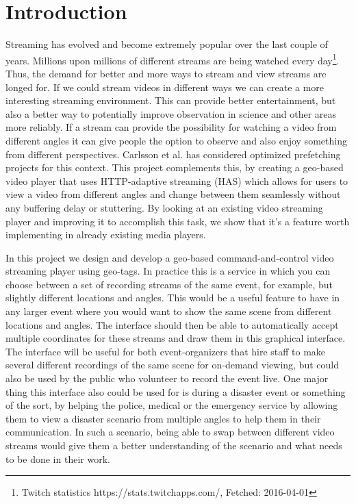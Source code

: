 \chapter{Introduction}
\label{cha:introduction}

Streaming has evolved and become extremely popular over the last couple of years. Millions upon millions of different streams are being watched every day\footnote{Twitch statistics https://stats.twitchapps.com/, Fetched: 2016-04-01}. Thus, the demand for better and more ways to stream and view streams are longed for. If we could stream videos in different ways we can create a more interesting streaming environment. This can provide better entertainment, but also a better way to potentially improve observation in science and other areas more reliably. If a stream can provide the possibility for watching a video from different angles it can give people the option to observe and also enjoy something from different perspectives. Carlsson et al.\cite{optimizedstreaming} has considered optimized prefetching projects for this context. This project complements this, by creating a geo-based video player that uses HTTP-adaptive streaming (HAS) which allows for users to view a video from different angles and change between them seamlessly without any buffering delay or stuttering. By looking at an existing video streaming player and improving it to accomplish this task, we show that it's a feature worth implementing in already existing media players.

In this project we design and develop a geo-based command-and-control video streaming player using geo-tags. In practice this is a service in which you can choose between a set of recording streams of the same event, for example, but slightly different locations and angles. This would be a useful feature to have in any larger event where you would want to show the same scene from different locations and angles. The interface should then be able to automatically accept multiple coordinates for these streams and draw them in this graphical interface. The interface will be useful for both event-organizers that hire staff to make several different recordings of the same scene for on-demand viewing, but could also be used by the public who volunteer to record the event live. One major thing this interface also could be used for is during a disaster event or something of the sort, by helping the police, medical or the emergency service by allowing them to view a disaster scenario from multiple angles to help them in their communication. In such a scenario, being able to swap between different video streams would give them a better understanding of the scenario and what needs to be done in their work.

